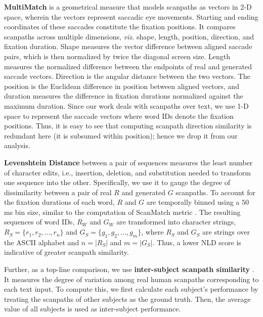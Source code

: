 \textbf{MultiMatch} is a geometrical measure that models scanpaths as vectors in 2-D space, wherein the vectors represent saccadic eye movements. Starting and ending coordinates of these saccades constitute the fixation positions. It compares scanpaths across multiple dimensions, \textit{viz.} shape, length, position, direction, and fixation duration. Shape measures the vector difference between aligned saccade pairs, which is then normalized by twice the diagonal screen size. Length measures the normalized difference between the endpoints of real and generated saccade vectors. Direction is the angular distance between the two vectors. The position is the Euclidean difference in position between aligned vectors, and duration measures the difference in fixation durations normalized against the maximum duration. Since our work deals with scanpaths over text, we use 1-D space to represent the saccade vectors where word IDs denote the fixation positions. Thus, it is easy to see that computing scanpath direction similarity is redundant here (it is subsumed within position); hence we drop it from our analysis. 


\textbf{Levenshtein Distance} between a pair of sequences measures the least number of character edits, i.e., insertion, deletion, and substitution needed to transform one sequence into the other.
Specifically, we use it to gauge the degree of dissimilarity between a pair of real $R$ and generated $G$ scanpaths. To account for the fixation durations of each word, $R$ and $G$ are temporally binned using a $50$ ms bin size, similar to the computation of ScanMatch metric \cite{cristino2010scanmatch}. The resulting sequences of word IDs, $R_W$ and $G_W$ are transformed into character strings, $R_S = \{r_1, r_2, ..., r_n\}$ and $G_S = \{g_1, g_2, ...,g_m\}$, where $R_S$ and $G_S$ are strings over the ASCII alphabet and $n = |R_S|$ and $m = |G_S|$.
Thus, a lower NLD score is indicative of greater scanpath similarity. 


Further, as a top-line comparison, we use \textbf{inter-subject scanpath similarity} \cite{sun2019visual}. It measures the degree of variation among real human scanpaths corresponding to each text input. To compute this, we first calculate each subject's performance by treating the scanpaths of other subjects as the ground truth. Then, the average value of all subjects is used as inter-subject performance.


